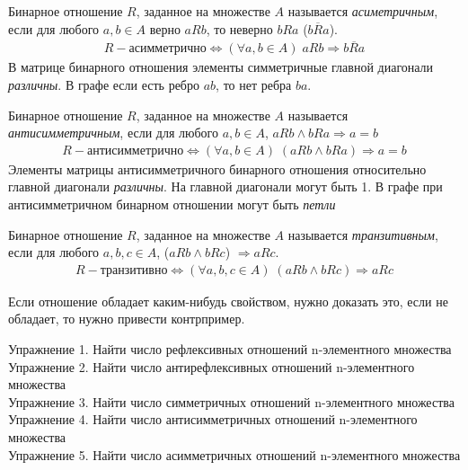 \begin{definition}
	Бинарное отношение $R$, заданное на множестве $A$ называется \textit{асиметричным}, если для любого $a, b \in A$ верно $aRb$, то неверно $bRa$ ($b\overline{R}a$).
	\begin{align*}
		R - \textit{асимметрично} \iff (\forall a,b \in A) \; aRb \Rightarrow \overline{bRa}
	\end{align*}
    В матрице бинарного отношения элементы симметричные главной диагонали \textit{различны}.
    В графе если есть ребро $ab$, то нет ребра $ba$.
\end{definition}

\begin{definition}
	Бинарное отношение $R$, заданное на множестве $A$ называется \textit{антисимметричным}, если для любого $a,b \in A$, $aRb \wedge bRa \Rightarrow a = b$
	\begin{align*}
		R - \textit{антисимметрично} \iff (\forall a, b \in A) \; (aRb \wedge bRa) \Rightarrow a = b
	\end{align*}
	Элементы матрицы антисимметричного бинарного отношения относительно главной диагонали \textit{различны}. На главной диагонали могут быть 1.
	В графе при антисимметричном бинарном отношении могут быть \textit{петли}
\end{definition}

\begin{definition}
	Бинарное отношение $R$, заданное на множестве $A$ называется \textit{транзитивным}, если для любого $a, b, c \in A$, ($aRb \wedge bRc$) $\Rightarrow aRc$.
	\begin{align*}
		R - \textit{транзитивно} \iff (\forall a, b, c \in A) \; (aRb \wedge bRc) \Rightarrow aRc
	\end{align*}
\end{definition}

Если отношение обладает каким-нибудь свойством, нужно доказать это, если
не обладает, то нужно привести контрпример.

Упражнение 1. Найти число рефлексивных отношений n-элементного
множества \\
Упражнение 2. Найти число антирефлексивных отношений n-элементного
множества \\
Упражнение 3. Найти число симметричных отношений n-элементного
множества \\
Упражнение 4. Найти число антисимметричных отношений n-элементного
множества \\
Упражнение 5. Найти число асимметричных отношений n-элементного
множества \\
